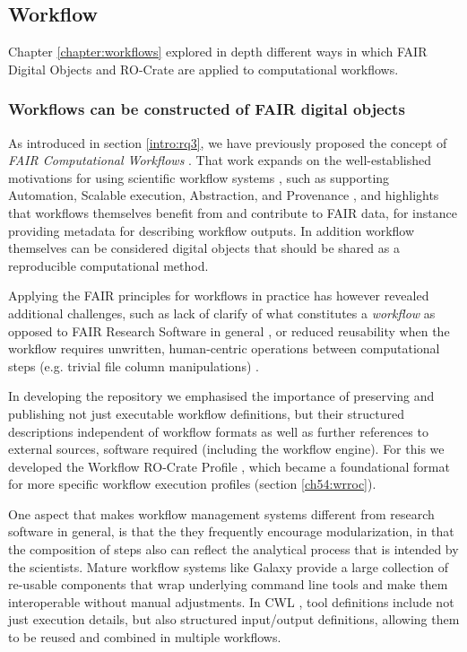 \subsection{Workflow}
\label{ch61:workflow}

Chapter \vref{chapter:workflows} explored in depth different ways in which FAIR Digital Objects and RO-Crate are applied to computational workflows. 

\subsubsection{Workflows can be constructed of FAIR digital objects}
\label{ch61:workflowfdo}

As introduced in section \vref{intro:rq3}, we have previously proposed the concept of \emph{FAIR Computational Workflows} \cite{Goble 2020}. 
That work expands on the well-established motivations for using scientific workflow systems \cite{ch6-4,Atkinson 2017}, such as supporting Automation, Scalable execution, Abstraction, and Provenance \cite{Ludascher 2016}, and highlights that workflows themselves benefit from and contribute to FAIR data, for instance providing metadata for describing workflow outputs. 
In addition workflow themselves can be considered digital objects that should be shared as a reproducible computational method.

Applying the FAIR principles for workflows in practice has however revealed additional challenges, such as lack of clarify of what constitutes a \emph{workflow} as opposed to FAIR Research Software in general \cite{Katz 2021b}, or reduced reusability when the workflow requires unwritten, human-centric operations between computational steps (e.g. trivial file column manipulations) \cite{wilkinsonWorkflowsWhenParts2022b}. 

In developing the repository  \cite{Goble 2021} we emphasised the importance of preserving and publishing not just executable workflow definitions, 
but their structured descriptions independent of workflow formats as well as further references to external sources, software required (including the workflow engine).
For this we developed the Workflow RO-Crate Profile \cite{Bacall 2022}, which became a foundational format for more specific workflow execution profiles (section \vref{ch54:wrroc}).

One aspect that makes workflow management systems different from research software in general, is that the they frequently encourage modularization, in that the composition of steps also can reflect the analytical process that is intended by the scientists.
Mature workflow systems like Galaxy \cite{Galaxy 2022} provide a large collection of re-usable components that wrap underlying command line tools and make them interoperable without manual adjustments. 
In CWL  \cite{Crusoe 2022}, tool definitions include not just execution details, but also structured input/output definitions, allowing them to be reused and combined in multiple workflows.

